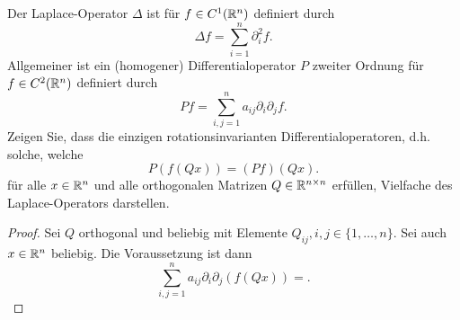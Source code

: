 \begin{Problem}
	Der Laplace-Operator $\Delta$ ist f\"{u}r $f\in C^1(\mathbb{R}^n)$ definiert durch
	\[
		\Delta f=\sum_{i=1}^n \partial_i^2 f
	.\] 
	Allgemeiner ist ein (homogener) Differentialoperator $P$ zweiter Ordnung f\"{u}r $f\in C^2(\mathbb{R}^n)$ definiert durch
	\[
		Pf=\sum_{i,j=1}^n a_{ij}\partial_i\partial_j f
	.\] 
	Zeigen Sie, dass die einzigen rotationsinvarianten Differentialoperatoren, d.h. solche, welche
	\[
		P(f(Qx))=(Pf)(Qx)
	.\] 
	f\"{u}r alle $x\in \mathbb{R}^n$ und alle orthogonalen Matrizen $Q\in \mathbb{R}^{n\times n}$ erfüllen, Vielfache des Laplace-Operators darstellen.
\end{Problem}
\begin{proof}
	Sei $Q$ orthogonal und beliebig mit Elemente $Q_{ij},i,j\in \{1,\dots, n\} $. Sei auch $x\in \mathbb{R}^n$ beliebig. Die Voraussetzung ist dann
	\[
		\sum_{i,j=1}^n a_{ij}\partial_i\partial_j \left(f\left( Qx \right)\right) =
	.\] 
\end{proof}

